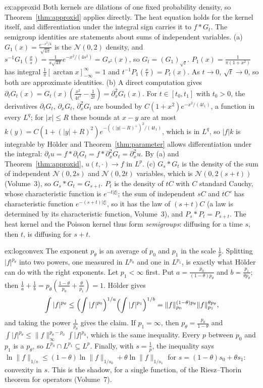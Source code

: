 \begin{solution}{ex:approxid}
\idea Both kernels are dilations of one fixed probability density, so Theorem~\ref{thm:approxid} applies directly. The heat equation holds for the kernel itself, and differentiation under the
integral sign carries it to $f*G_t$. The semigroup identities are statements about sums of independent variables.
\writeup (a) $G_1(x)=\frac{e^{-x^2/4}}{\sqrt{4\pi}}$ is the $\mathcal N(0,2)$ density, and $s^{-1}G_1(\frac xs)=\frac1{s\sqrt{4\pi}}e^{-x^2/(4s^2)}=G_{s^2}(x)$, so $G_t=(G_1)_{\sqrt t}$. $P_1(x)=\frac1{\pi(1+x^2)}$ has integral
$\frac1\pi[\arctan x]_{-\infty}^\infty=1$ and $t^{-1}P_1(\frac xt)=P_t(x)$. As $t\to0$, $\sqrt t\to0$, so both are approximate identities. (b) A direct computation gives
$\partial_tG_t(x)=G_t(x)(\frac{x^2}{4t^2}-\frac1{2t})=\partial_x^2G_t(x)$. For $t\in[t_0,t_1]$ with $t_0>0$, the derivatives $\partial_tG_t$, $\partial_xG_t$, $\partial^2_xG_t$ are bounded by $C(1+x^2)e^{-x^2/(4t_1)}$, a function in every $L^q$;
for $|x|\le R$ these bounds at $x-y$ are at most $k(y)=C(1+(|y|+R)^2)e^{-((|y|-R)^+)^2/(4t_1)}$, which is in $L^q$, so $|f|k$ is integrable by H\"older and Theorem~\ref{thm:parameter} allows differentiation under the integral: $\partial_tu=f*\partial_tG_t=f*\partial_x^2G_t=\partial_x^2u$.
By (a) and Theorem~\ref{thm:approxid}, $u(t,\cdot)\to f$ in $L^p$. (c) $G_s*G_t$ is the density of the sum of independent $\mathcal N(0,2s)$ and $\mathcal N(0,2t)$ variables, which is $\mathcal N(0,2(s+t))$ (Volume~3),
so $G_s*G_t=G_{s+t}$. $P_t$ is the density of $tC$ with $C$ standard Cauchy, whose characteristic function is $e^{-t|\xi|}$; the sum of independent $sC$ and $tC'$ has characteristic function
$e^{-(s+t)|\xi|}$, so it has the law of $(s+t)C$ (a law is determined by its characteristic function, Volume~3), and $P_s*P_t=P_{s+t}$. The heat kernel and the Poisson kernel thus form \emph{semigroups}:
diffusing for a time $s$, then $t$, is diffusing for $s+t$.
\end{solution}

\begin{solution}{ex:logconvex}
\idea The exponent $p_\theta$ is an average of $p_0$ and $p_1$ in the scale $\frac1p$. Splitting $|f|^{p_\theta}$ into two powers, one measured in $L^{p_0}$ and one in $L^{p_1}$, is exactly what H\"older can do with the
right exponents.
\writeup Let $p_1<\infty$ first. Put $a=\frac{p_0}{(1-\theta)p_\theta}$ and $b=\frac{p_1}{\theta p_\theta}$; then $\frac1a+\frac1b=p_\theta(\frac{1-\theta}{p_0}+\frac\theta{p_1})=1$. H\"older gives
\[\int|f|^{p_\theta}\le\Bigl(\int|f|^{p_0}\Bigr)^{1/a}\Bigl(\int|f|^{p_1}\Bigr)^{1/b}=\|f\|_{p_0}^{(1-\theta)p_\theta}\|f\|_{p_1}^{\theta p_\theta},\]
and taking the power $\frac1{p_\theta}$ gives the claim. If $p_1=\infty$, then $p_\theta=\frac{p_0}{1-\theta}$ and $\int|f|^{p_\theta}\le\|f\|_\infty^{p_\theta-p_0}\int|f|^{p_0}$, which is the same inequality. Every $p$ between $p_0$ and $p_1$ is a
$p_\theta$, so $L^{p_0}\cap L^{p_1}\subseteq L^p$. Finally, with $s=\frac1p$, the inequality says $\ln\|f\|_{1/s}\le(1-\theta)\ln\|f\|_{1/s_0}+\theta\ln\|f\|_{1/s_1}$ for $s=(1-\theta)s_0+\theta s_1$: convexity in $s$. This is the
shadow, for a single function, of the Riesz--Thorin theorem for operators (Volume~7).
\end{solution}

